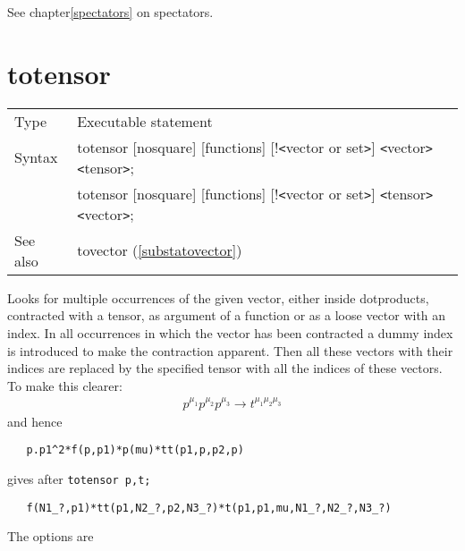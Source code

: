 \noindent See chapter\ref{spectators} on spectators.
\vspace{10mm}


\section{totensor}
\label{substatotensor}

\noindent \begin{tabular}{ll}
Type & Executable statement\\
Syntax & totensor [nosquare] [functions] [!{\tt<}vector or set{\tt>}] {\tt<}vector{\tt>} {\tt<}tensor{\tt>}; \\
       & totensor [nosquare] [functions] [!{\tt<}vector or set{\tt>}] {\tt<}tensor{\tt>} {\tt<}vector{\tt>};
\\ See also & tovector (\ref{substatovector})
\end{tabular} \vspace{4mm}

\noindent Looks for multiple occurrences of the given 
vector, either inside dotproducts, contracted with a tensor, as argument of 
a function or as a loose vector with an index. In all occurrences in 
which the vector has been contracted a dummy index is introduced to make 
the contraction apparent. Then all these vectors with their indices are 
replaced by the specified tensor with all the indices of these vectors. To 
make this clearer:
\begin{eqnarray}
    p^{\mu_1}p^{\mu_2}p^{\mu_3} \rightarrow t^{\mu_1\mu_2\mu_3} \nonumber
\end{eqnarray}
\setcounter{equation}{6}
and hence
\begin{verbatim}
   p.p1^2*f(p,p1)*p(mu)*tt(p1,p,p2,p)
\end{verbatim}
gives after \verb:totensor p,t;:
\begin{verbatim}
   f(N1_?,p1)*tt(p1,N2_?,p2,N3_?)*t(p1,p1,mu,N1_?,N2_?,N3_?)
\end{verbatim}\vspace{4mm}

\noindent The options are



